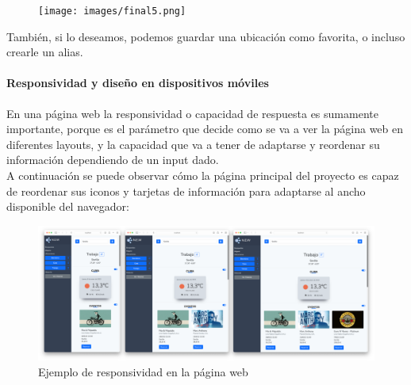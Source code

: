 \documentclass[../ei103948-project-documentation.tex]{subfiles}
\begin{document}
                                \vspace*{-3mm}
                                \begin{figure}[H]
                                    \begin{center}
                                        \hspace*{-12mm}
                                    \texttt{[image: images/final5.png]}
                                    \end{center}
                                \end{figure}

                                También, si lo deseamos, podemos guardar una ubicación como favorita, o incluso crearle un alias.

                                \paragraph{Responsividad y diseño en dispositivos móviles}

                                En una página web la responsividad o capacidad de respuesta es sumamente importante, porque es el parámetro que decide como se va a ver la página web en diferentes layouts, y la capacidad que va a tener de adaptarse y reordenar su información dependiendo de un input dado.\\

                                A continuación se puede observar cómo la página principal del proyecto es capaz de reordenar sus iconos y tarjetas de información para adaptarse al ancho disponible del navegador:


                                \begin{figure}[H]  
                                    \begin{center}
                                    \hspace*{-12mm} 
                                    \includegraphics[scale=0.4]{images/Responsivo.png}
                                    \end{center}
                                    \caption{Ejemplo de responsividad en la página web}
                                \end{figure}
\end{document}
